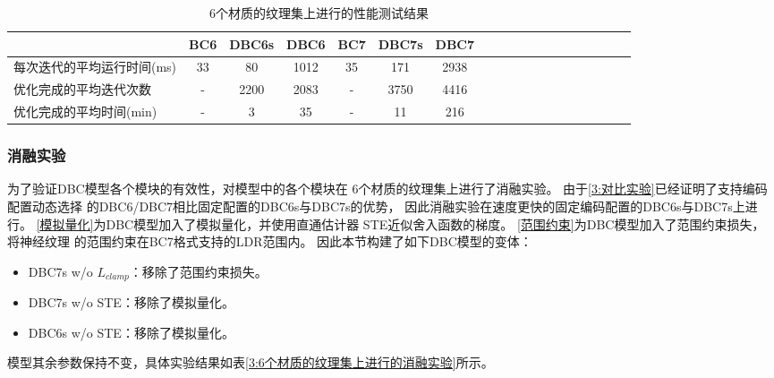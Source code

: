 \begin{table*}[htbp]
    \centering
    \caption{6个材质的纹理集上进行的性能测试结果}
    \label{3:6个材质的纹理集上进行的性能实验}        
    \begin{tabular}{lcccccccccccccccccc}
        \toprule
                                    & BC6 & DBC6s & DBC6 & BC7  & DBC7s & DBC7 \\
        \midrule
        每次迭代的平均运行时间(ms)  & 33  &  80    & 1012 & 35   & 171   &  2938 \\
        优化完成的平均迭代次数      & -   &  2200  & 2083 & -   & 3750   &  4416 \\
        优化完成的平均时间(min)     & -   &  3     & 35   & -   & 11      &  216\\
        \bottomrule
\end{tabular} %
\end{table*}

\subsubsection{消融实验}

为了验证DBC模型各个模块的有效性，对模型中的各个模块在
6个材质的纹理集上进行了消融实验。
由于\ref{3:对比实验}已经证明了支持编码配置动态选择
的DBC6/DBC7相比固定配置的DBC6s与DBC7s的优势，
因此消融实验在速度更快的固定编码配置的DBC6s与DBC7s上进行。
\ref{模拟量化}为DBC模型加入了模拟量化，并使用直通估计器
STE\cite{bengio2013estimating}近似舍入函数的梯度。
\ref{范围约束}为DBC模型加入了范围约束损失，将神经纹理
的范围约束在BC7格式支持的LDR范围内。
因此本节构建了如下DBC模型的变体：
\begin{itemize}
    \item DBC7s w/o $L_{clamp}$：移除了范围约束损失。
    \item DBC7s w/o STE：移除了模拟量化。
    \item DBC6s w/o STE：移除了模拟量化。
\end{itemize}
模型其余参数保持不变，具体实验结果如表\ref{3:6个材质的纹理集上进行的消融实验}所示。

